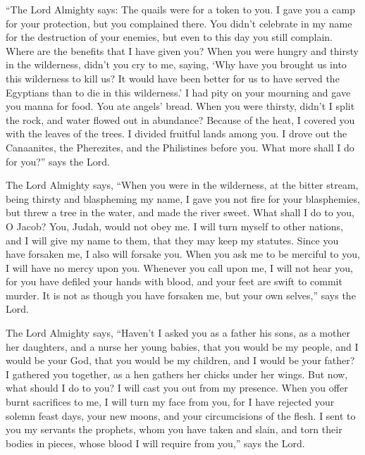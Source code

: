  ``The Lord Almighty says: The quails were for a token to
you. I gave you a camp for your protection, but you complained there.
 You didn't celebrate in my name for the destruction of
your enemies, but even to this day you still complain. 
Where are the benefits that I have given you? When you were hungry and
thirsty in the wilderness, didn't you cry to me,  saying,
`Why have you brought us into this wilderness to kill us? It would have
been better for us to have served the Egyptians than to die in this
wilderness.'  I had pity on your mourning and gave you
manna for food. You ate angels' bread.  When you were
thirsty, didn't I split the rock, and water flowed out in abundance?
Because of the heat, I covered you with the leaves of the trees.
 I divided fruitful lands among you. I drove out the
Canaanites, the Pherezites, and the Philistines before you. What more
shall I do for you?'' says the Lord.

 The Lord Almighty says, ``When you were in the
wilderness, at the bitter stream, being thirsty and blaspheming my name,
 I gave you not fire for your blasphemies, but threw a
tree in the water, and made the river sweet.  What shall
I do to you, O Jacob? You, Judah, would not obey me. I will turn myself
to other nations, and I will give my name to them, that they may keep my
statutes.  Since you have forsaken me, I also will
forsake you. When you ask me to be merciful to you, I will have no mercy
upon you.  Whenever you call upon me, I will not hear
you, for you have defiled your hands with blood, and your feet are swift
to commit murder.  It is not as though you have forsaken
me, but your own selves,'' says the Lord.

 The Lord Almighty says, ``Haven't I asked you as a
father his sons, as a mother her daughters, and a nurse her young
babies,  that you would be my people, and I would be your
God, that you would be my children, and I would be your father?
 I gathered you together, as a hen gathers her chicks
under her wings. But now, what should I do to you? I will cast you out
from my presence.  When you offer burnt sacrifices to me,
I will turn my face from you, for I have rejected your solemn feast
days, your new moons, and your circumcisions of the flesh.
 I sent to you my servants the prophets, whom you have
taken and slain, and torn their bodies in pieces, whose blood I will
require from you,'' says the Lord.

